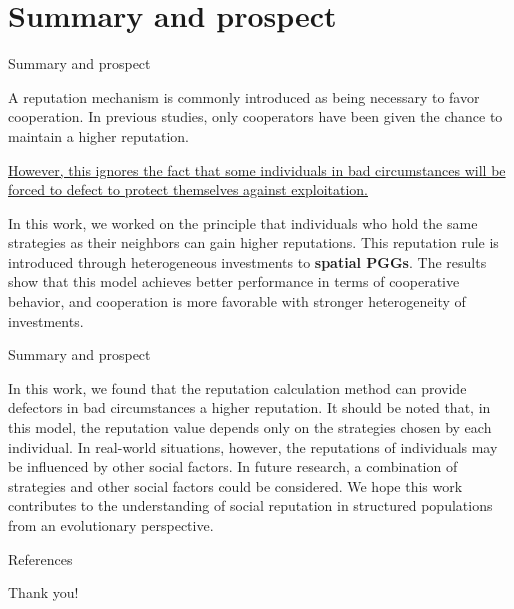 \documentclass[notheorems,11pt,compress]{beamer}
\numberwithin{figure}{section}
\numberwithin{table}{section}
\numberwithin{equation}{section}
\theoremstyle{plain}
\numberwithin{theorem}{section}
\numberwithin{definition}{section}
\numberwithin{lemma}{section}
\numberwithin{proposition}{section}
\numberwithin{corollary}{section}
\theoremstyle{example}
\begin{document}
\section{Summary and prospect}

\begin{frame}{Summary and prospect}

	A reputation mechanism is commonly introduced as being necessary to favor cooperation.
	In previous studies, only cooperators have been given the chance to maintain a higher reputation.

	\uline{However, this ignores the fact that some individuals in bad circumstances will be forced to defect to protect themselves against exploitation. }

	In this work, we worked on the principle that individuals who hold the same strategies as their neighbors can gain higher reputations.
	This reputation rule is introduced through heterogeneous investments to \textbf{spatial PGGs}.
	The results show that this model achieves better performance in terms of cooperative behavior, and cooperation is more favorable with stronger heterogeneity of investments.
\end{frame}


\begin{frame}{Summary and prospect}

	In this work, we found that the reputation calculation method can provide defectors in bad circumstances a higher reputation.
	It should be noted that, in this model, the reputation value depends only on the strategies chosen by each individual.
	In real-world situations, however, the reputations of individuals may be influenced by other social factors.
	In future research, a combination of strategies and other social factors could be considered.
	We hope this work contributes to the understanding of social reputation in structured populations from an evolutionary perspective.
\end{frame}


\begin{frame}[allowframebreaks]{References}
	\printbibliography
\end{frame}



\begin{frame}
	\begin{center}
		{\textcolor[RGB]{165,3,3}{\fontsize{60}{0}\selectfont
				Thank you!}}
	\end{center}
\end{frame}
\end{document}
